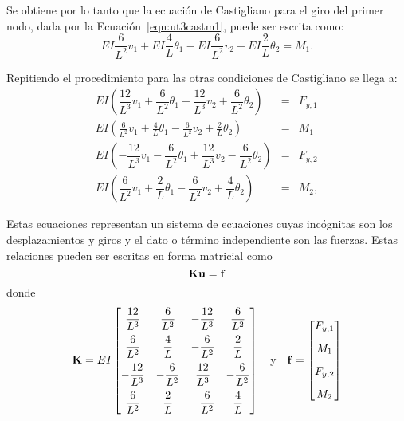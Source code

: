 Se obtiene por lo tanto que la ecuación de Castigliano para el giro del primer nodo, dada por la Ecuación~\eqref{eqn:ut3castm1}, puede ser escrita como:
%
\begin{equation}
EI \frac{6}{L^2} v_1 +  EI \frac{4}{L} \theta_1 - EI \frac{6}{L^2} v_2 +    EI \frac{2}{L} \theta_2 = M_1.
\end{equation}


Repitiendo el procedimiento para las otras condiciones de Castigliano se llega a:
%
\begin{eqnarray}
EI \left( \dfrac{12}{L^{3}} v_1 + \dfrac{6}{L^{2}} \theta_1 - \dfrac{12}{L^{3}} v_2 + \dfrac{6}{L^{2}} \theta_2 \right)  &=& F_{y,1} \\
EI \left( \frac{6}{L^2} v_1 +  \frac{4}{L} \theta_1 - \frac{6}{L^2} v_2   + \frac{2}{L} \theta_2 \right) &=& M_1 \\
EI \left( -\dfrac{12}{L^{3}} v_1 - \dfrac{6}{L^{2}} \theta_1 +\dfrac{12}{L^{3}} v_2 - \dfrac{6}{L^{2}} \theta_2 \right) &=& F_{y,2} \\
EI \left( \dfrac{6}{L^{2}} v_1 + \dfrac{2}{L} \theta_1 - \dfrac{6}{L^{2}} v_2 + \dfrac{4}{L}  \theta_2 \right) &=& M_2,
\end{eqnarray}
%

Estas ecuaciones representan un sistema de ecuaciones cuyas incógnitas son los desplazamientos y giros y el dato o término independiente son las fuerzas. %
%
Estas relaciones pueden ser escritas en forma matricial como
\begin{equation}
{\bf K} {\bf u} = {\bf f}	
\end{equation}
%
donde
\begin{equation}
{\bf K} =  EI \left[
\begin{matrix}
\dfrac{12}{L^{3}}  & \dfrac{6}{L^{2}} & - \dfrac{12}{L^{3}} & \dfrac{6}{L^{2}} \\[3mm]
\dfrac{6}{L^2}  & \dfrac{4}{L} & - \dfrac{6}{L^2} & \dfrac{2}{L}  \\[3mm]
-\dfrac{12}{L^{3}} & - \dfrac{6}{L^{2}} & \dfrac{12}{L^{3}} & - \dfrac{6}{L^{2}} \\[3mm]
\dfrac{6}{L^{2}} & \dfrac{2}{L} & - \dfrac{6}{L^{2}} & \dfrac{4}{L} 
\end{matrix}
\right]
\quad \text{y}\quad
{\bf f} =  \left[
\begin{matrix}
F_{y,1} \\[3mm]
M_{1} \\[3mm]
F_{y,2} \\[3mm]
M_{2} \\
\end{matrix}
\right]
\end{equation}



